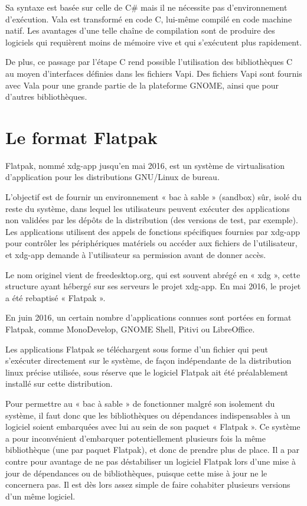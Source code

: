 \documentclass[12pt]{report}
\begin{document}
Sa syntaxe est basée sur celle de C\# mais il ne nécessite pas
d'environnement d'exécution. Vala est transformé en code C, lui-même
compilé en code machine natif. Les avantages d'une telle chaîne de
compilation sont de produire des logiciels qui requièrent moins de
mémoire vive et qui s'exécutent plus rapidement.

De plus, ce passage par l'étape C rend possible l'utilisation des
bibliothèques C au moyen d'interfaces définies dans les fichiers
Vapi. Des fichiers Vapi sont fournis avec Vala pour une grande partie
de la plateforme GNOME, ainsi que pour d'autres bibliothèques.

\section{Le format Flatpak}
Flatpak, nommé xdg-app jusqu’en mai 2016, est un système de
virtualisation d’application pour les distributions GNU/Linux de
bureau.

L'objectif est de fournir un environnement « bac à sable » (sandbox)
sûr, isolé du reste du système, dans lequel les utilisateurs peuvent
exécuter des applications non validées par les dépôts de la
distribution (des versions de test, par exemple). Les applications
utilisent des appels de fonctions spécifiques fournies par xdg-app
pour contrôler les périphériques matériels ou accéder aux fichiers de
l'utilisateur, et xdg-app demande à l'utilisateur sa permission avant
de donner accès.

Le nom originel vient de freedesktop.org, qui est souvent abrégé en «
xdg », cette structure ayant hébergé sur ses serveurs le projet
xdg-app. En mai 2016, le projet a été rebaptisé « Flatpak ».

En juin 2016, un certain nombre d'applications connues sont portées en
format Flatpak, comme MonoDevelop, GNOME Shell, Pitivi ou LibreOffice.

Les applications Flatpak se téléchargent sous forme d'un fichier qui
peut s’exécuter directement sur le système, de façon indépendante de
la distribution linux précise utilisée, sous réserve que le logiciel
Flatpak ait été préalablement installé sur cette distribution.

Pour permettre au « bac à sable » de fonctionner malgré son isolement
du système, il faut donc que les bibliothèques ou dépendances
indispensables à un logiciel soient embarquées avec lui au sein de son
paquet « Flatpak ». Ce système a pour inconvénient d'embarquer
potentiellement plusieurs fois la même bibliothèque (une par paquet
Flatpak), et donc de prendre plus de place. Il a par contre pour
avantage de ne pas déstabiliser un logiciel Flatpak lors d'une mise à
jour de dépendances ou de bibliothèques, puisque cette mise à jour ne
le concernera pas. Il est dès lors assez simple de faire cohabiter
plusieurs versions d'un même logiciel.
\end{document}
